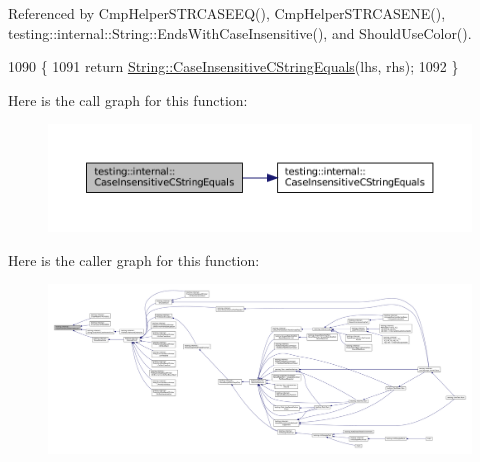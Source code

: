 Referenced by Cmp\+Helper\+S\+T\+R\+C\+A\+S\+E\+E\+Q(), Cmp\+Helper\+S\+T\+R\+C\+A\+S\+E\+N\+E(), testing\+::internal\+::\+String\+::\+Ends\+With\+Case\+Insensitive(), and Should\+Use\+Color().


\begin{DoxyCode}
1090                                                                            \{
1091   \textcolor{keywordflow}{return} \hyperlink{namespacetesting_1_1internal_ad5b31f61a3cc5b4226d3560f5b48f4dd}{String::CaseInsensitiveCStringEquals}(lhs, rhs);
1092 \}
\end{DoxyCode}
Here is the call graph for this function\+:
\nopagebreak
\begin{figure}[H]
\begin{center}
\leavevmode
\includegraphics[width=350pt]{namespacetesting_1_1internal_aebfd0cd34de52d7973a5b2d03ba848cf_cgraph}
\end{center}
\end{figure}
Here is the caller graph for this function\+:
\nopagebreak
\begin{figure}[H]
\begin{center}
\leavevmode
\includegraphics[width=350pt]{namespacetesting_1_1internal_aebfd0cd34de52d7973a5b2d03ba848cf_icgraph}
\end{center}
\end{figure}
\mbox{\label{namespacetesting_1_1internal_ad5b31f61a3cc5b4226d3560f5b48f4dd}} 
